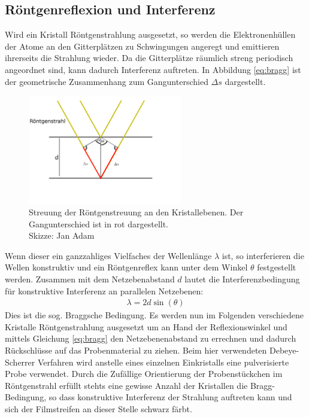 \subsection{Röntgenreflexion und Interferenz}
Wird ein Kristall Röntgenstrahlung ausgesetzt, so werden die Elektronenhüllen der Atome an den Gitterplätzen zu Schwingungen angeregt und emittieren ihrerseits die Strahlung wieder. Da die Gitterplätze räumlich streng periodisch angeordnet sind, kann dadurch Interferenz auftreten. In Abbildung \ref{eq:bragg} ist der geometrische Zusammenhang zum Gangunterschied $\Delta s$ dargestellt.
\begin{figure}[htbp]
	\includegraphics[width=0.6\textwidth]{../pics/bragg.png}
	\caption{Streuung der Röntgenstreuung an den Kristallebenen. Der Gangunterschied ist in rot dargestellt.\\
		Skizze: Jan Adam}
	\label{pic:bragg}
\end{figure}
Wenn dieser ein ganzzahliges Vielfaches der Wellenlänge $\lambda$ ist, so interferieren die Wellen konstruktiv und ein Röntgenreflex kann unter dem Winkel $\theta$ festgestellt werden. Zusammen mit dem Netzebenabstand $d$ lautet die Interferenzbedingung für konstruktive Interferenz an parallelen Netzebenen:
\begin{align}
 \lambda = 2 d \sin(\theta)
 \label{eq:bragg}
\end{align}
Dies ist die sog. Braggsche Bedingung. Es werden nun im Folgenden verschiedene Kristalle Röntgenstrahlung ausgesetzt um an Hand der Reflexionswinkel und mittels Gleichung \ref{eq:bragg} den Netzebenenabstand zu errechnen und dadurch Rückschlüsse auf das Probenmaterial zu ziehen. Beim hier verwendeten Debeye-Scherrer Verfahren wird anstelle eines einzelnen Einkristalls eine pulverisierte Probe verwendet. Durch die Zufällige Orientierung der Probenstückchen im Röntgenstrahl erfüllt stehts eine gewisse Anzahl der Kristallen die Bragg-Bedingung, so dass konstruktive Interferenz der Strahlung auftreten kann und sich der Filmstreifen an dieser Stelle schwarz färbt.

